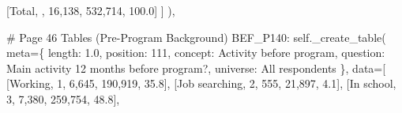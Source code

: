 \documentclass[
  11pt,
  a4paper,
]{article}
\newenvironment{Shaded}{\begin{snugshade}}{\end{snugshade}}
\newcommand{\CommentTok}[1]{\textcolor[rgb]{0.37,0.37,0.37}{#1}}
\newcommand{\NormalTok}[1]{\textcolor[rgb]{0.00,0.23,0.31}{#1}}
\newcommand{\OperatorTok}[1]{\textcolor[rgb]{0.37,0.37,0.37}{#1}}
\newcommand{\StringTok}[1]{\textcolor[rgb]{0.13,0.47,0.30}{#1}}
\newcommand{\VariableTok}[1]{\textcolor[rgb]{0.07,0.07,0.07}{#1}}
\begin{document}
\begin{Shaded}
\begin{Highlighting}[]
\NormalTok{            [}\StringTok{\textquotesingle{}Total\textquotesingle{}}\NormalTok{, }\StringTok{\textquotesingle{}\textquotesingle{}}\NormalTok{, }\StringTok{\textquotesingle{}16,138\textquotesingle{}}\NormalTok{, }\StringTok{\textquotesingle{}532,714\textquotesingle{}}\NormalTok{, }\StringTok{\textquotesingle{}100.0\textquotesingle{}}\NormalTok{]}
\NormalTok{        ]}
\NormalTok{    ),}

    \CommentTok{\# Page 46 Tables (Pre{-}Program Background)}
    \StringTok{\textquotesingle{}BEF\_P140\textquotesingle{}}\NormalTok{: }\VariableTok{self}\NormalTok{.\_create\_table(}
\NormalTok{        meta}\OperatorTok{=}\NormalTok{\{}
            \StringTok{\textquotesingle{}length\textquotesingle{}}\NormalTok{: }\StringTok{\textquotesingle{}1.0\textquotesingle{}}\NormalTok{, }\StringTok{\textquotesingle{}position\textquotesingle{}}\NormalTok{: }\StringTok{\textquotesingle{}111\textquotesingle{}}\NormalTok{,}
            \StringTok{\textquotesingle{}concept\textquotesingle{}}\NormalTok{: }\StringTok{\textquotesingle{}Activity before program\textquotesingle{}}\NormalTok{,}
            \StringTok{\textquotesingle{}question\textquotesingle{}}\NormalTok{: }\StringTok{\textquotesingle{}Main activity 12 months before program?\textquotesingle{}}\NormalTok{,}
            \StringTok{\textquotesingle{}universe\textquotesingle{}}\NormalTok{: }\StringTok{\textquotesingle{}All respondents\textquotesingle{}}
\NormalTok{        \},}
\NormalTok{        data}\OperatorTok{=}\NormalTok{[}
\NormalTok{            [}\StringTok{\textquotesingle{}Working\textquotesingle{}}\NormalTok{, }\StringTok{\textquotesingle{}1\textquotesingle{}}\NormalTok{, }\StringTok{\textquotesingle{}6,645\textquotesingle{}}\NormalTok{, }\StringTok{\textquotesingle{}190,919\textquotesingle{}}\NormalTok{, }\StringTok{\textquotesingle{}35.8\textquotesingle{}}\NormalTok{],}
\NormalTok{            [}\StringTok{\textquotesingle{}Job searching\textquotesingle{}}\NormalTok{, }\StringTok{\textquotesingle{}2\textquotesingle{}}\NormalTok{, }\StringTok{\textquotesingle{}555\textquotesingle{}}\NormalTok{, }\StringTok{\textquotesingle{}21,897\textquotesingle{}}\NormalTok{, }\StringTok{\textquotesingle{}4.1\textquotesingle{}}\NormalTok{],}
\NormalTok{            [}\StringTok{\textquotesingle{}In school\textquotesingle{}}\NormalTok{, }\StringTok{\textquotesingle{}3\textquotesingle{}}\NormalTok{, }\StringTok{\textquotesingle{}7,380\textquotesingle{}}\NormalTok{, }\StringTok{\textquotesingle{}259,754\textquotesingle{}}\NormalTok{, }\StringTok{\textquotesingle{}48.8\textquotesingle{}}\NormalTok{],}

\end{Highlighting}
\end{Shaded}
\end{document}
